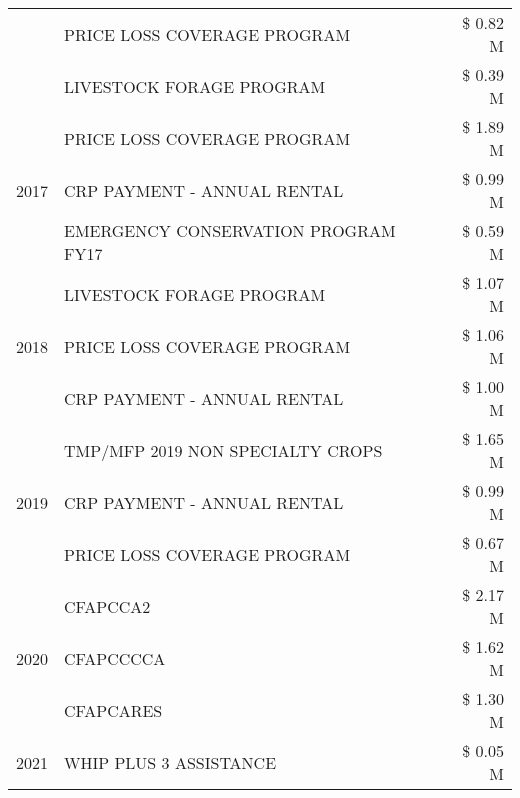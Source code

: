 \begin{tabular}{llr}
 & PRICE LOSS COVERAGE PROGRAM & \$ 0.82 M \\
 & LIVESTOCK FORAGE PROGRAM & \$ 0.39 M \\
\cline{1-3}
\multirow[t]{3}{*}{2017} & PRICE LOSS COVERAGE PROGRAM & \$ 1.89 M \\
 & CRP PAYMENT - ANNUAL RENTAL & \$ 0.99 M \\
 & EMERGENCY CONSERVATION PROGRAM FY17 & \$ 0.59 M \\
\cline{1-3}
\multirow[t]{3}{*}{2018} & LIVESTOCK FORAGE PROGRAM & \$ 1.07 M \\
 & PRICE LOSS COVERAGE PROGRAM & \$ 1.06 M \\
 & CRP PAYMENT - ANNUAL RENTAL & \$ 1.00 M \\
\cline{1-3}
\multirow[t]{3}{*}{2019} & TMP/MFP 2019 NON SPECIALTY CROPS & \$ 1.65 M \\
 & CRP PAYMENT - ANNUAL RENTAL & \$ 0.99 M \\
 & PRICE LOSS COVERAGE PROGRAM & \$ 0.67 M \\
\cline{1-3}
\multirow[t]{3}{*}{2020} & CFAPCCA2 & \$ 2.17 M \\
 & CFAPCCCCA & \$ 1.62 M \\
 & CFAPCARES & \$ 1.30 M \\
\cline{1-3}
2021 & WHIP PLUS 3 ASSISTANCE & \$ 0.05 M \\
\cline{1-3}
\bottomrule
\end{tabular}
